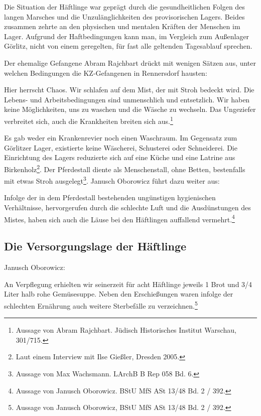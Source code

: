 \documentclass[a4paper,12pt,ngerman,
]{nisebook}
\begin{document}

Die Situation der Häftlinge war geprägt durch die gesundheitlichen Folgen des langen Marsches und die Unzulänglichkeiten des provisorischen Lagers. Beides zusammen zehrte an den physischen und mentalen Kräften der Menschen im Lager. Aufgrund der Haftbedingungen kann man, im Vergleich zum Außenlager Görlitz, nicht von einem geregelten, für fast alle geltenden Tagesablauf sprechen. 

Der ehemalige Gefangene Abram Rajchbart drückt mit wenigen Sätzen aus, unter welchen Bedingungen die KZ-Gefangenen in Rennersdorf hausten:

\begin{leftbar} 
Hier herrscht Chaos. Wir schlafen auf dem Mist, der mit Stroh bedeckt wird. Die Lebens- und Arbeitsbedingungen sind unmenschlich und entsetzlich. Wir haben keine Möglichkeiten, uns zu waschen und die Wäsche zu wechseln. Das Ungeziefer verbreitet sich, auch die Krankheiten breiten sich aus.\footnote{Aussage von Abram Rajchbart. Jüdisch Historisches Institut Warschau, 301/715.}
\end{leftbar}

Es gab weder ein Krankenrevier noch einen Waschraum. Im Gegensatz zum Görlitzer Lager, existierte keine Wäscherei, Schusterei oder Schneiderei. Die Einrichtung des Lagers reduzierte sich auf eine Küche und eine Latrine aus Birkenholz\footnote{Laut einem Interview  mit Ilse Gießler, Dresden 2005.}. Der Pferdestall diente als \glqq Menschenstall\grqq, ohne Betten, bestenfalls mit etwas Stroh ausgelegt\footnote{Aussage von Max Wachsmann. LArchB B Rep 058 Bd. 6.}. Janusch Oborowicz führt dazu weiter aus:

\begin{leftbar} 
Infolge der in dem Pferdestall bestehenden ungünstigen hygienischen Verhältnisse, hervorgerufen durch die schlechte Luft und die Ausdünstungen des Mistes, haben sich auch die Läuse bei den Häftlingen auffallend vermehrt.\footnote{Aussage von Janusch Oborowicz. BStU MfS ASt 13/48 Bd. 2 / 392.}
\end{leftbar}




\subsection{Die Versorgungslage der Häftlinge}


Janusch Oborowicz:
\begin{leftbar} 
An Verpflegung erhielten wir seinerzeit für acht Häftlinge jeweils 1 Brot und 3/4 Liter halb rohe Gemüsesuppe. Neben den Erschießungen waren infolge der schlechten Ernährung auch weitere Sterbefälle zu verzeichnen.\footnote{Aussage von Janusch Oborowicz, BStU MfS ASt 13/48 Bd. 2 / 392.}
\end{leftbar}
\end{document}
